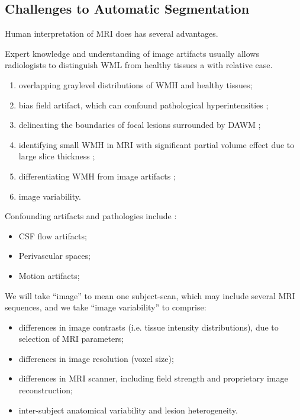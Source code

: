 \subsection{Challenges to Automatic Segmentation}\label{ss:autochallenges}
Human interpretation of MRI does has several advantages. 

Expert knowledge and understanding of image artifacts usually allows radiologists to distinguish WML from healthy tissues a with relative ease. 

\begin{enumerate}[itemsep=0pt,topsep=0pt]
  \item overlapping graylevel distributions of WMH and healthy tissues;
  \item bias field artifact, which can confound pathological hyperintensities \cite{Wardlaw2015};
  \item delineating the boundaries of focal lesions surrounded by DAWM \cite{Ge2003};
  \item identifying small WMH in MRI with significant partial volume effect due to large slice thickness \cite{Khademi2012};
  \item differentiating WMH from image artifacts \cite{Wardlaw2015};
  \item image variability.
\end{enumerate}
Confounding artifacts and pathologies include \cite{Wardlaw2015}:
\begin{itemize}[itemsep=0pt,topsep=0pt]
  \item CSF flow artifacts;
  \item Perivascular spaces;
  \item Motion artifacts;
\end{itemize}
We will take ``image'' to mean one subject-scan, which may include several MRI sequences, and we take ``image variability'' to comprise:
\begin{itemize}[itemsep=0pt,topsep=0pt]
  \item differences in image contrasts (i.e. tissue intensity distributions), due to selection of MRI parameters;
  \item differences in image resolution (voxel size);
  \item differences in MRI scanner, including field strength and proprietary image reconstruction;
  \item inter-subject anatomical variability and lesion heterogeneity.
\end{itemize}

